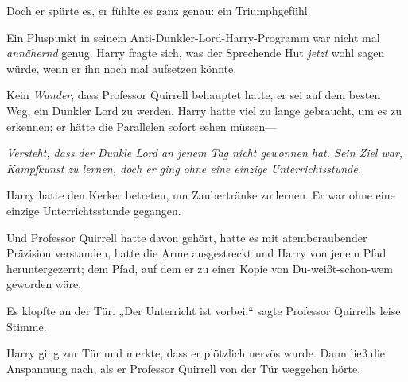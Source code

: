 Doch er spürte es, er fühlte es ganz genau: ein Triumphgefühl.

Ein Pluspunkt in seinem Anti-Dunkler-Lord-Harry-Programm war nicht mal \emph{annähernd} genug. Harry fragte sich, was der Sprechende Hut \emph{jetzt} wohl sagen würde, wenn er ihn noch mal aufsetzen könnte.

Kein \emph{Wunder}, dass Professor Quirrell behauptet hatte, er sei auf dem besten Weg, ein Dunkler Lord zu werden. Harry hatte viel zu lange gebraucht, um es zu erkennen; er hätte die Parallelen sofort sehen müssen—

\emph{Versteht, dass der Dunkle Lord an jenem Tag nicht gewonnen hat. Sein Ziel war, Kampfkunst zu lernen, doch er ging ohne eine einzige Unterrichtsstunde.}

Harry hatte den Kerker betreten, um Zaubertränke zu lernen. Er war ohne eine einzige Unterrichtsstunde gegangen.

Und Professor Quirrell hatte davon gehört, hatte es mit atemberaubender Präzision verstanden, hatte die Arme ausgestreckt und Harry von jenem Pfad heruntergezerrt; dem Pfad, auf dem er zu einer Kopie von Du-weißt-schon-wem geworden wäre.

Es klopfte an der Tür. „Der Unterricht ist vorbei,“ sagte Professor Quirrells leise Stimme.

Harry ging zur Tür und merkte, dass er plötzlich nervös wurde. Dann ließ die Anspannung nach, als er Professor Quirrell von der Tür weggehen hörte.

